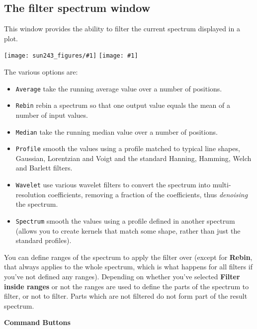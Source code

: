 \documentclass[twoside,11pt,nolof]{starlink}
\providecommand{\mainfigure}[1]
{\begin{center}
    \ifpdf
    \texttt{[image: sun243\_figures/\#1]}
    \else
    \texttt{[image: \#1]}
    \fi
 \end{center}
}
\newcommand{\labelitem}[1]{\textbf{#1}}
\providecommand{\hitext}[1]{\texttt{#1}}
\providecommand{\subheading}[1]{\textbf{\large{#1}}}
\begin{document}
\newpage
\subsection{The filter spectrum window}

This window provides the ability to filter the current spectrum
displayed in a plot.

\mainfigure{filterwindow}

The various options are:
\begin{itemize}
  \item \hitext{Average} take the running average value over a
        number of positions.
  \item \hitext{Rebin} rebin a spectrum so that one output value
        equals the mean of a number of input values.
  \item \hitext{Median} take the running median value over a
        number of positions.
  \item \hitext{Profile} smooth the values using a profile matched
        to typical line shapes, Gaussian, Lorentzian and Voigt and
        the standard Hanning, Hamming, Welch and Barlett filters.
  \item \hitext{Wavelet} use various wavelet filters to convert the
        spectrum into multi-resolution coefficients, removing a
        fraction of the coefficients, thus \textit{denoising} the
        spectrum.
  \item \hitext{Spectrum} smooth the values using a profile
        defined in another spectrum (allows you to create kernels
        that match some shape, rather than just the standard profiles).
\end{itemize}

You can define ranges of the spectrum to apply the filter over (except for
\labelitem{Rebin}, that always applies to the whole spectrum, which is what
happens for all filters if you've not defined any ranges).  Depending on
whether you've selected \labelitem{Filter inside ranges} or not the ranges are
used to define the parts of the spectrum to filter, or not to filter. Parts
which are not filtered do not form part of the result spectrum.

\subheading{Command Buttons}
\end{document}
